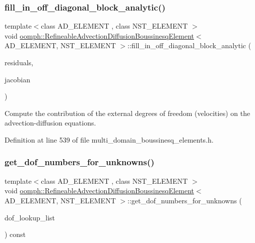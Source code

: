 \subsubsection{\texorpdfstring{fill\+\_\+in\+\_\+off\+\_\+diagonal\+\_\+block\+\_\+analytic()}{fill\_in\_off\_diagonal\_block\_analytic()}}
{\footnotesize\ttfamily template$<$class A\+D\+\_\+\+E\+L\+E\+M\+E\+NT , class N\+S\+T\+\_\+\+E\+L\+E\+M\+E\+NT $>$ \\
void \hyperlink{classoomph_1_1RefineableAdvectionDiffusionBoussinesqElement}{oomph\+::\+Refineable\+Advection\+Diffusion\+Boussinesq\+Element}$<$ A\+D\+\_\+\+E\+L\+E\+M\+E\+NT, N\+S\+T\+\_\+\+E\+L\+E\+M\+E\+NT $>$\+::fill\+\_\+in\+\_\+off\+\_\+diagonal\+\_\+block\+\_\+analytic (\begin{DoxyParamCaption}\item[{Vector$<$ double $>$ \&}]{residuals,  }\item[{Dense\+Matrix$<$ double $>$ \&}]{jacobian }\end{DoxyParamCaption})\hspace{0.3cm}{\ttfamily [inline]}}



Compute the contribution of the external degrees of freedom (velocities) on the advection-\/diffusion equations. 



Definition at line 539 of file multi\+\_\+domain\+\_\+boussinesq\+\_\+elements.\+h.

\mbox{\label{classoomph_1_1RefineableAdvectionDiffusionBoussinesqElement_a9b48b8a752432bce03a4bc51785d0151}} 
\subsubsection{\texorpdfstring{get\+\_\+dof\+\_\+numbers\+\_\+for\+\_\+unknowns()}{get\_dof\_numbers\_for\_unknowns()}}
{\footnotesize\ttfamily template$<$class A\+D\+\_\+\+E\+L\+E\+M\+E\+NT , class N\+S\+T\+\_\+\+E\+L\+E\+M\+E\+NT $>$ \\
void \hyperlink{classoomph_1_1RefineableAdvectionDiffusionBoussinesqElement}{oomph\+::\+Refineable\+Advection\+Diffusion\+Boussinesq\+Element}$<$ A\+D\+\_\+\+E\+L\+E\+M\+E\+NT, N\+S\+T\+\_\+\+E\+L\+E\+M\+E\+NT $>$\+::get\+\_\+dof\+\_\+numbers\+\_\+for\+\_\+unknowns (\begin{DoxyParamCaption}\item[{std\+::list$<$ std\+::pair$<$ unsigned long, unsigned $>$ $>$ \&}]{dof\+\_\+lookup\+\_\+list }\end{DoxyParamCaption}) const\hspace{0.3cm}{\ttfamily [inline]}}




